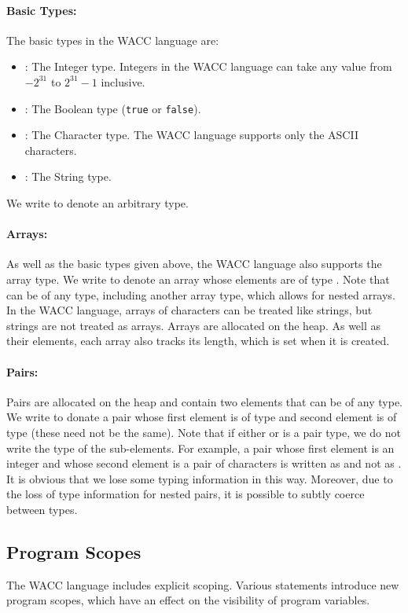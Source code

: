 \documentclass[a4paper]{article}
\newcommand{\shell}[1]{\lstinline{#1}}
\theoremstyle{definition}
\begin{document}
\paragraph{Basic Types:} 
The basic types in the WACC language are:
\begin{itemize}
  \item {}: The Integer type. Integers in the WACC language can take any value from $-2^{31}$ to $2^{31} - 1$ inclusive.
  \item {}: The Boolean type (\shell{true} or \shell{false}).
  \item {}: The Character type. The WACC language supports only the ASCII characters.
  \item {}: The String type. 
\end{itemize}
We write  to denote an arbitrary type.

\paragraph{Arrays:} 
As well as the basic types given above, the WACC language also supports the array type.
We write  to denote an array whose elements are of type .
Note that  can be of any type, including another array type, which allows for nested arrays.
In the WACC language, arrays of characters can be treated like strings, but strings are not treated as arrays.
Arrays are allocated on the heap.
As well as their elements, each array also tracks its length, which is set when it is created.
 
\paragraph{Pairs:}
Pairs are allocated on the heap and contain two elements that can be of any type. 
We write  to donate a pair whose first element is of type  and second element is of type  
(these need not be the same). 
Note that if either  or  is a pair type, we do not write the type of the sub-elements. 
For example, a pair whose first element is an integer
and whose second element is a pair of characters is written as  and not as . 
It is obvious that we lose some typing information in this way. 
Moreover, due to the loss of type information for nested pairs, it is possible to subtly coerce between types.

\subsection{Program Scopes}
The WACC language includes explicit scoping.
Various statements introduce new program scopes, which have an effect on the visibility of program variables.
\end{document}
